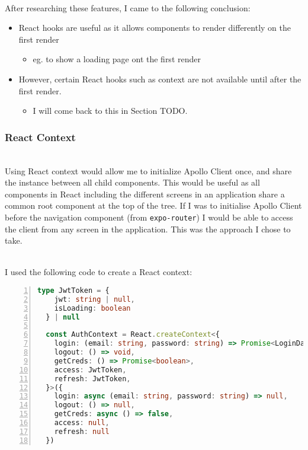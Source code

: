 \documentclass[../../main.tex]{subfiles}
\begin{document}
\noindent \\ After researching these features, I came to the following conclusion:

\begin{itemize}
  \item React hooks are useful as it allows components to render differently on the first render
        \begin{itemize}
          \item eg. to show a loading page ont the first render
        \end{itemize}
  \item However, certain React hooks such as context are not
        available until after the first render.
        \begin{itemize}
          \item I will come back to this in Section TODO.
        \end{itemize}
\end{itemize}

\subsubsection{React Context}

\noindent \\ Using React context would allow me to initialize Apollo Client once,
and share the instance between all child components. This would be useful as
all components in React including the different screens in an application share a common
root component at the top of the tree. If I was to initialise Apollo Client
before the navigation component (from \lstinline{expo-router}) I would be able to access
the client from any screen in the application. This was the approach I chose to take.

\noindent \\ I used the following code to create a React context:

\begin{lstlisting}[language=typescript, numbers=left, framesep=6pt]
  type JwtToken = {
    jwt: string | null,
    isLoading: boolean
  } | null

  const AuthContext = React.createContext<{
    login: (email: string, password: string) => Promise<LoginData | null | undefined>,
    logout: () => void,
    getCreds: () => Promise<boolean>,
    access: JwtToken,
    refresh: JwtToken,
  }>({
    login: async (email: string, password: string) => null,
    logout: () => null,
    getCreds: async () => false,
    access: null,
    refresh: null
  })
\end{lstlisting}
\end{document}
